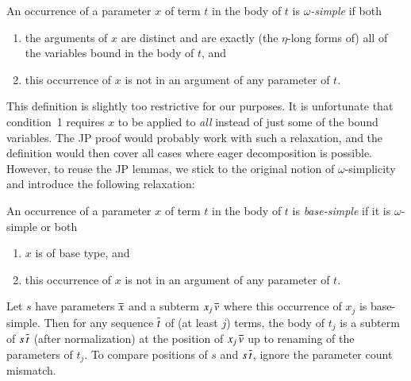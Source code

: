   \begin{defi}
  [$\jp D2$]\label{unif:def:omega-simple}An occurrence of a parameter $x$ of term $t$
  in the body of $t$ is $\omega$\emph{-simple }if both
  \begin{enumerate}
  \item the arguments of $x$ are distinct and are exactly (the $\eta$-long
  forms of) all of the variables bound in the body of $t$, and
  \item this occurrence of $x$ is not in an argument of any parameter
  of $t$.
  \end{enumerate}
  \end{defi}
  This definition is slightly too restrictive for our purposes.
  It is unfortunate that condition~1 requires $x$ to be applied to
  \emph{all} instead of just some of the bound variables. The JP
  proof would probably work with such a relaxation, and the definition
  would then cover all cases where eager decomposition is possible. 
  However, to reuse the JP lemmas, we stick to the original
  notion of $\omega$-simplicity and introduce the following relaxation:
  \begin{defi}
  An occurrence of a parameter $x$ of term $t$ in the body of $t$
  is \emph{base-simple} if it is $\omega$-simple or both
  \begin{enumerate}
  \item $x$ is of base type, and
  \item this occurrence of $x$ is not in an argument of any parameter
  of $t$.
  \end{enumerate}
  \end{defi}
  \begin{lemma}\label{lem:base-simple->inj.}
  Let $s$ have parameters $\overline{x}$ and a subterm $x_{j}\,\overline{v}$ 
  where this occurrence of $x_{j}$ is base-simple.
  Then for any sequence $\overline{t}$ of (at least $j$) terms, the body of
  $t_{j}$ is a subterm of $s\,\overline{t}$ (after normalization) at the position
  of $x_{j}\,\overline{v}$ up to renaming of the parameters of $t_{j}$. 
  To compare positions of $s$ and $s\,\overline{t}$, ignore
  the parameter count mismatch.
  \end{lemma}
